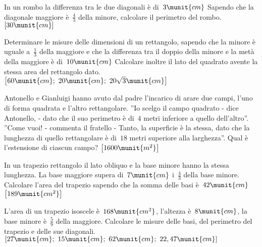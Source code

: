 \begin{htmulticols}{2}
\begin{esercizio}[*]
\label{ese:14.96}
In un rombo la differenza tra le due diagonali è di~\(3\munit{cm}\) Sapendo che la 
diagonale maggiore è~\(\frac{4}{3}\) della minore, calcolare il perimetro del 
rombo. \hfill \(\left[30\munit{cm}\right]\)
\end{esercizio}

\begin{esercizio}[*]
\label{ese:14.97}
Determinare le misure delle dimensioni di un rettangolo, sapendo che la minore 
è 
uguale a~\(\frac{1}{3}\) della maggiore e che la differenza tra il doppio della 
minore e la metà della maggiore è di~\(10\munit{cm}\) Calcolare inoltre il lato 
del 
quadrato avente la stessa area del rettangolo dato. 
\hfill \(\left[60\munit{cm};~20\munit{cm};~20\sqrt{3}\munit{cm}\right]\)
\end{esercizio}

\begin{esercizio}[*]
\label{ese:14.98}
Antonello e Gianluigi hanno avuto dal padre l'incarico di arare due campi, 
l'uno 
di forma quadrata e l'altro rettangolare. ''Io scelgo il campo quadrato - dice 
Antonello, - dato che il suo perimetro è di~\(4\) metri inferiore a quello 
dell'altro''. ''Come vuoi! - commenta il fratello - Tanto, la superficie è la 
stessa, dato che la lunghezza di quello rettangolare è di~\(18\) metri superiore 
alla larghezza''. Qual è l'estensione di ciascun campo?
 \hfill \(\left[1600\munit{m^2}\right]\)
\end{esercizio}

\begin{esercizio}[*]
\label{ese:14.99}
In un trapezio rettangolo il lato obliquo e la base minore hanno la stessa 
lunghezza. La base maggiore supera di~\(7\munit{cm}\) i~\(\frac{4}{3}\) della base 
minore. Calcolare l'area del trapezio sapendo che la somma delle basi 
è~\(42\munit{cm}\) \hfill \(\left[189\munit{cm^2}\right]\)
\end{esercizio}

\begin{esercizio}[*]
\label{ese:14.100}
L'area di un trapezio isoscele è~\(168\munit{cm^2}\), l'altezza è~\(8\munit{cm}\), la 
base minore è~\(\frac{5}{9}\) della maggiore. Calcolare le misure delle basi, del 
perimetro del trapezio e delle sue diagonali. 
\hfill \(\left[27\munit{cm};~15\munit{cm};~62\munit{cm};~22,47\munit{cm}\right]\)
\end{esercizio}


\end{htmulticols}
